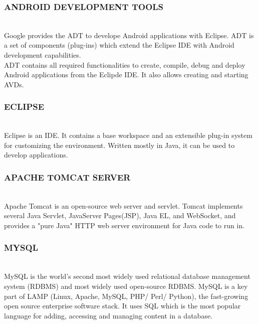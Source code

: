 \documentclass[12pt,a4paper]{article}
\begin{document}
\subsubsection{ANDROID DEVELOPMENT TOOLS}
\\
\hspace{0.7 cm} Google provides the ADT to develope Android applications with Eclipse. ADT is a set of components (plug-ins) which extend the Eclipse IDE with Android development capabilities.  
\\
\hspace{0.7 cm} ADT contains all required functionalities to create, compile, debug and deploy Android applications from the Eclipde IDE. It also allows creating and starting AVDs.
\\
\newpage
\subsubsection{ECLIPSE}
\\
\hspace{0.7 cm} Eclipse is an IDE. It contains a base workspace and an extensible plug-in system for customizing the environment. Written mostly in Java, it can be used to develop applications. 
\\

\newpage
\subsubsection{APACHE TOMCAT SERVER}
\\
\hspace{0.7 cm} Apache Tomcat is an open-source web server and servlet. Tomcat implements several Java Servlet, JavaServer Pages(JSP), Java EL, and WebSocket, and provides a "pure Java" HTTP web server environment for Java code to run in.  
\\

\newpage
\subsubsection{MYSQL}
\\
\hspace{0.7 cm} MySQL is the world's second most widely used relational database management system (RDBMS) and most widely used open-source RDBMS. MySQL is a key part of LAMP (Linux, Apache, MySQL, PHP/ Perl/ Python), the fast-growing open source enterprise software stack. It uses SQL which is the most popular language for adding, accessing and managing content in a database.
\\
\end{document}
